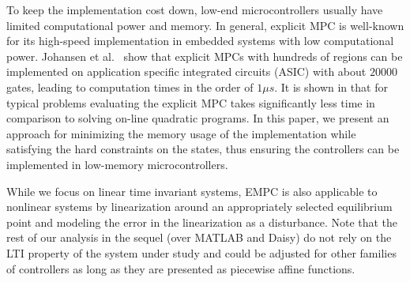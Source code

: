 
To keep the implementation cost down, low-end microcontrollers usually have limited computational power and memory. 
In general, explicit MPC is well-known for its high-speed implementation in embedded systems with low computational power. 
Johansen et al.~\cite{Johansen:2007} show that explicit MPCs with hundreds of regions can be implemented on application specific integrated circuits (ASIC) 
with about $20000$ gates, leading to computation times in the order of $1\mu s$. 
It is shown in \cite{Bemporad:2006} that for typical problems evaluating the explicit MPC takes significantly less
time in comparison to solving on-line quadratic programs.
In this paper, we present an approach for minimizing the memory usage of the implementation while satisfying
the hard constraints on the states, thus ensuring the controllers can be implemented in low-memory microcontrollers.

While we focus on linear time invariant systems, EMPC is also applicable to nonlinear systems by linearization
around an appropriately selected equilibrium point and modeling the error in the linearization as a disturbance.
% 
Note that the rest of our analysis in the sequel (over MATLAB and Daisy) do not 
rely on the LTI property of the system under study and could be adjusted for other families of controllers
as long as they are presented as piecewise affine functions.

